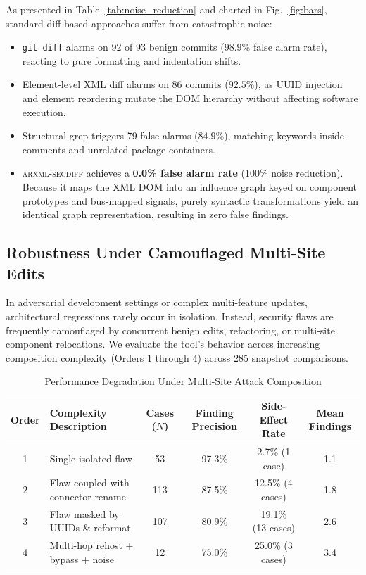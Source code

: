 \documentclass[journal]{IEEEtran}
\begin{document}
As presented in Table~\ref{tab:noise_reduction} and charted in Fig.~\ref{fig:bars}, standard diff-based approaches suffer from catastrophic noise:
\begin{itemize}
\item \texttt{git diff} alarms on 92 of 93 benign commits ($98.9\%$ false alarm rate), reacting to pure formatting and indentation shifts.
\item Element-level XML diff alarms on 86 commits ($92.5\%$), as UUID injection and element reordering mutate the DOM hierarchy without affecting software execution.
\item Structural-grep triggers 79 false alarms ($84.9\%$), matching keywords inside comments and unrelated package containers.
\item \textsc{arxml-secdiff} achieves a \textbf{0.0\% false alarm rate} (100\% noise reduction). Because it maps the XML DOM into an influence graph keyed on component prototypes and bus-mapped signals, purely syntactic transformations yield an identical graph representation, resulting in zero false findings.
\end{itemize}

\subsection{Robustness Under Camouflaged Multi-Site Edits}
\label{subsec:composition_degradation}

In adversarial development settings or complex multi-feature updates, architectural regressions rarely occur in isolation. Instead, security flaws are frequently camouflaged by concurrent benign edits, refactoring, or multi-site component relocations. We evaluate the tool's behavior across increasing composition complexity (Orders 1 through 4) across 285 snapshot comparisons.

\begin{table}[htbp]
\centering
\caption{Performance Degradation Under Multi-Site Attack Composition}
\label{tab:composition_degradation}
\renewcommand{\arraystretch}{1.15}
\begin{tabular}{c l c c c c}
\toprule
\textbf{Order} & \textbf{Complexity Description} & \textbf{Cases ($N$)} & \textbf{Finding Precision} & \textbf{Side-Effect Rate} & \textbf{Mean Findings} \\
\midrule
1 & Single isolated flaw               & 53  & 97.3\% & 2.7\% (1 case)   & 1.1 \\
2 & Flaw coupled with connector rename & 113 & 87.5\% & 12.5\% (4 cases)  & 1.8 \\
3 & Flaw masked by UUIDs \& reformat   & 107 & 80.9\% & 19.1\% (13 cases) & 2.6 \\
4 & Multi-hop rehost + bypass + noise  & 12  & 75.0\% & 25.0\% (3 cases)  & 3.4 \\
\bottomrule
\end{tabular}
\end{table}
\end{document}
